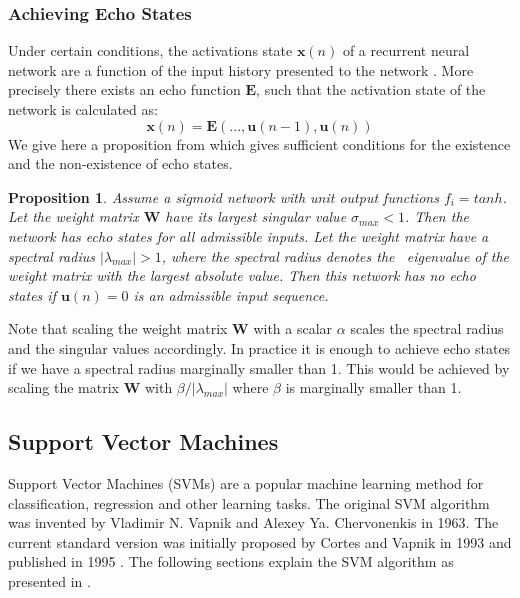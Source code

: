 \documentclass[a4paper,11pt,oneside]{article}
\newtheorem{prop}{Proposition}
\begin{document}
\subsubsection*{Achieving Echo States}
Under certain conditions, the activations state $\mathbf{x}(n)$ of a recurrent neural network are a function of 
the input history presented to the network \cite{jaeg6}. More precisely there exists an echo function $\mathbf{E}$, 
such that the activation state of the network is calculated as:
\begin{equation}
\mathbf{x}(n) = \mathbf{E}(...,\mathbf{u}(n-1),\mathbf{u}(n))
\end{equation}
We give here a proposition from \cite{jaeg6} which gives sufficient conditions for the existence and the 
non-existence of echo states.
\begin{prop}
Assume a sigmoid network with unit output functions $f_i=tanh$. Let the weight matrix $\mathbf{W}$ have its 
largest singular value $\sigma_{max} <1$. Then the network has echo states for all admissible inputs. 
Let the weight matrix have a spectral radius $|\lambda_{max}| > 1$, where the spectral radius denotes the \
eigenvalue of the weight matrix with the largest absolute value. Then this network has no echo states if 
$\mathbf{u}(n)=0$ is an admissible input sequence.
\end{prop}
Note that scaling the weight matrix $\mathbf{W}$ with a scalar $\alpha$ scales the spectral radius and the 
singular values accordingly. In practice it is enough to achieve echo states if we have a spectral radius 
marginally smaller than 1. This would be achieved by scaling the matrix $\mathbf{W}$ with $\beta/|\lambda_{max}|$ 
where $\beta$ is marginally smaller than 1.
\subsection{Support Vector Machines}\label{svms}
Support Vector Machines (SVMs) are a popular machine learning method for classification, regression 
and other learning tasks. The original SVM algorithm was invented by Vladimir N. Vapnik and Alexey Ya. 
Chervonenkis in 1963. The current standard version was initially proposed by Cortes and Vapnik in 1993 
and published in 1995 \cite{cortes1995support}. The following sections explain the SVM algorithm as presented 
in \cite{fletcher2009support,law2006simple,berwick2003idiot}.
\end{document}
